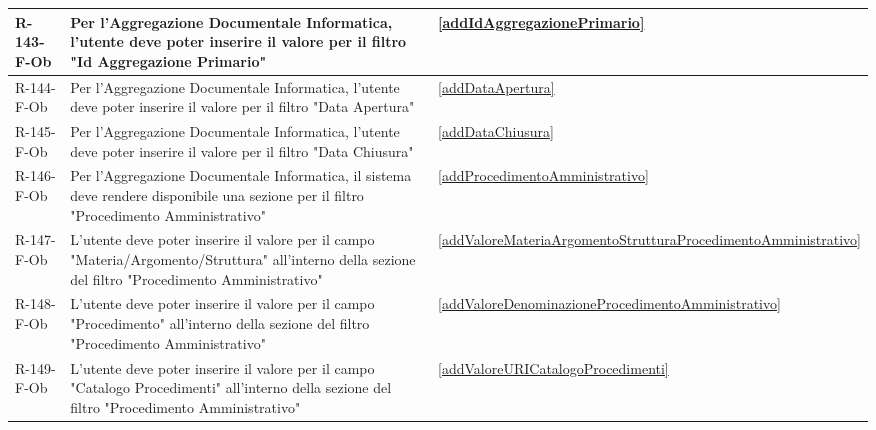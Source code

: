 \begin{longtable}{|p{2.5cm}|p{9.5cm}|p{2.5cm}|}
\hline
R-143-F-Ob & Per l'Aggregazione Documentale Informatica, l'utente deve poter inserire il valore per il filtro "Id Aggregazione Primario" & \ref{addIdAggregazionePrimario} \\
\hline
R-144-F-Ob & Per l'Aggregazione Documentale Informatica, l'utente deve poter inserire il valore per il filtro "Data Apertura" & \ref{addDataApertura} \\
\hline
R-145-F-Ob & Per l'Aggregazione Documentale Informatica, l'utente deve poter inserire il valore per il filtro "Data Chiusura" & \ref{addDataChiusura} \\
\hline
R-146-F-Ob & Per l'Aggregazione Documentale Informatica, il sistema deve rendere disponibile una sezione per il filtro "Procedimento Amministrativo" & \ref{addProcedimentoAmministrativo} \\
\hline
R-147-F-Ob & L'utente deve poter inserire il valore per il campo "Materia/Argomento/Struttura" all'interno della sezione del filtro "Procedimento Amministrativo" & \ref{addValoreMateriaArgomentoStrutturaProcedimentoAmministrativo} \\
\hline
R-148-F-Ob & L'utente deve poter inserire il valore per il campo "Procedimento" all'interno della sezione del filtro "Procedimento Amministrativo" & \ref{addValoreDenominazioneProcedimentoAmministrativo} \\
\hline
R-149-F-Ob & L'utente deve poter inserire il valore per il campo "Catalogo Procedimenti" all'interno della sezione del filtro "Procedimento Amministrativo" & \ref{addValoreURICatalogoProcedimenti} \\
\hline



\end{longtable}
